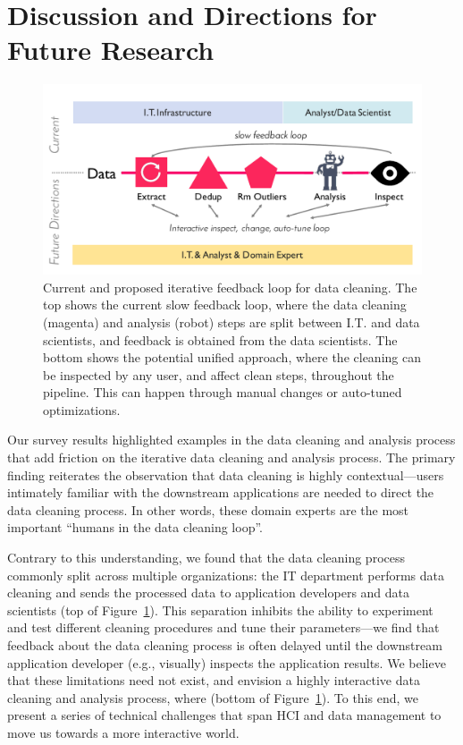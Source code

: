 \section{Discussion and Directions for Future Research}\label{sec:future}


\begin{figure}[ht]
  \centering
  \includegraphics[width=.95\columnwidth]{datafigs/arch}
  \caption{Current and proposed iterative feedback loop for data cleaning.  
  The top shows the current slow feedback loop, where the data cleaning (magenta) and analysis (robot) steps are split between I.T. and data scientists, and feedback is obtained from the data scientists. 
  The bottom shows the potential unified approach, where the cleaning can be inspected by any user, and affect clean steps, throughout the pipeline.  This can happen through manual changes or auto-tuned optimizations.
  }
  \label{f:arch}
\end{figure}

Our survey results highlighted examples in the data cleaning and analysis process that add friction on the iterative data cleaning and analysis process.  The primary finding reiterates the observation that data cleaning is highly contextual---users intimately familiar with the downstream applications are needed to direct the data cleaning process.  In other words, these domain experts are the most important ``humans in the data cleaning loop''.  

Contrary to this understanding, we found that the data cleaning process commonly split across multiple organizations: the IT department performs data cleaning and sends the processed data to application developers and data scientists (top of Figure~\ref{f:arch}).  This separation inhibits the ability to experiment and test different cleaning procedures and tune their parameters---we find that feedback about the data cleaning process is often delayed until the downstream application developer (e.g., visually) inspects the application results.  We believe that these limitations need not exist, and envision a highly interactive data cleaning and analysis process, where {\color{red}{something sexy}} (bottom of Figure~\ref{f:arch}). To this end, we present a series of technical challenges that span HCI and data management to move us towards a more interactive world.


